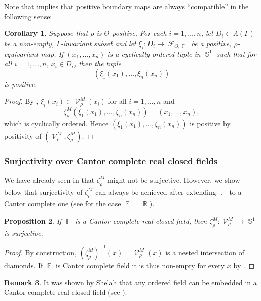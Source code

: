 \documentclass{amsart}
\theoremstyle{plain}
\newtheorem{proposition}{Proposition}[section]
\newtheorem{corollary}[proposition]{Corollary}
\theoremstyle{definition}
\newtheorem{remark}[proposition]{Remark}
\newcommand{\bdext}{{\Vc^M_\rho}}
\DeclareMathOperator{\Fc}{\mathcal{F}}
\DeclareMathOperator{\Vc}{\mathcal{V}}
\DeclareMathOperator{\Fb}{{\mathbb{F}}}
\DeclareMathOperator{\Rb}{{\mathbb{R}}}
\DeclareMathOperator{\Sb}{\mathbb{S}}
\newcommand{\1}{\mathbf{1}}
\begin{document}
Note that  implies that positive boundary maps are always ``compatible'' in the following sense:

\begin{corollary}\label{coro: compatibility positive boundary maps}
    Suppose that $\rho$ is $\Theta$-positive. For each $i=1,\dots,n$, let $D_i\subset\Lambda(\Gamma)$ be a non-empty, $\Gamma$-invariant subset and let 
    $\xi_i: D_i \to \Fc_{\Theta,\Fb}$ be a positive, $\rho$-equivariant map. If $(x_1,\dots,x_n)$ is a cyclically ordered tuple in $\Sb^1$ such that for all $i=1,\dots,n$, $x_i\in D_i$, then the tuple \[(\xi_1(x_1), \ldots, \xi_n(x_n))\]
    is positive.
\end{corollary}

\begin{proof}
    By , $\xi_i(x_i) \in \Vc^M_\rho(x_i)$ for all $i=1,\dots,n$ and 
    \[\zeta^M_\rho( \xi_1(x_1), \ldots, \xi_n(x_n)) = (x_1, \ldots, x_n),\] 
    which is cyclically ordered. Hence $(\xi_1(x_1), \ldots, \xi_n(x_n))$ is positive by positivity of $(\bdext,\zeta_\rho^{M})$.
\end{proof}




\subsubsection{Surjectivity over Cantor complete real closed fields}
\label{sss:Surjectivity Cantor Complete}
We have already seen in  that $\zeta^M_\rho$ might not be surjective. However, we show below that surjectivity of $\zeta^M_\rho$ can always be achieved after extending $\Fb$ to a Cantor complete one (see  for the case $\Fb=\Rb$).


\begin{proposition}\label{proposition: cantor complete field admit surjective boundary extension}
    If $\Fb$ is a Cantor complete real closed field, then $\zeta^M_\rho: \bdext  \to \Sb^1$ is surjective.
\end{proposition}

\begin{proof}
By construction, $(\zeta^M_\rho)^{-1}(x) = \bdext (x)$ is a nested intersection of diamonds. If $\Fb$ is Cantor complete field it is thus non-empty for every $x$ by .
\end{proof}

\begin{remark}
    It was shown by Shelah that any ordered field can be embedded in a Cantor complete real closed field (see \cite[Theorem 1.1]{Shelah_QuiteCompleteRealClosedFields}).

\end{remark}
\end{document}
